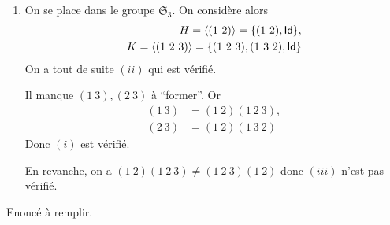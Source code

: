 {\begin{td-sol}[]
\begin{enumerate}
\begin{enumerate}
\begin{remark}
                    En revance, c'est un fait (pas trivial) que tout groupe fini abélien
                    est isomorphe à un produit de groupes cycliques.
                \end{remark}
            \end{enumerate}

            \item On se place dans le groupe \(\mathfrak{S}_3\). On considère alors
            \begin{equation*}
                \begin{aligned}
                    H = \langle (1~2)\rangle = \{(1~2), \operatorname{\mathsf{Id}}\},\\
                    K = \langle (1~2~3)\rangle = \{(1~2~3), (1~3~2), \operatorname{\mathsf{Id}}\}
                \end{aligned}
            \end{equation*}
            On a tout de suite \((ii)\) qui est vérifié.

            Il manque \((1~3), (2~3)\) à ``former''. Or
            \begin{equation*}
                \begin{aligned}
                    (1~3) &= (1~2)(1~2~3),\\
                    (2~3) &= (1~2)(1~3~2)
                \end{aligned}
            \end{equation*}
            Donc \((i)\) est vérifié.

            En revanche, on a \((1~2)(1~2~3) \neq (1~2~3)(1~2)\) donc 
            \((iii)\) n'est pas vérifié.
        \end{enumerate}
    \end{td-sol} %
}{}

\begin{td-exo}[Exo 12] %
    Enoncé à remplir.
\end{td-exo}

